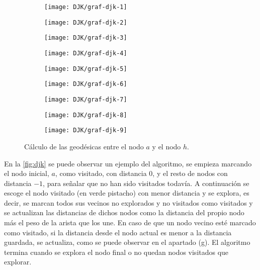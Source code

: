 \begin{figure}[htb]
	\centering
	\begin{subfigure}{0.32\linewidth}
		\texttt{[image: DJK/graf-djk-1]}
		\caption{}
	\end{subfigure}
	\begin{subfigure}{0.32\linewidth}
		\texttt{[image: DJK/graf-djk-2]}
		\caption{}
	\end{subfigure}
	\begin{subfigure}{0.32\linewidth}
		\texttt{[image: DJK/graf-djk-3]}
		\caption{}
	\end{subfigure}
	\begin{subfigure}{0.32\linewidth}
		\texttt{[image: DJK/graf-djk-4]}
		\caption{}
	\end{subfigure}
	\begin{subfigure}{0.32\linewidth}
		\texttt{[image: DJK/graf-djk-5]}
		\caption{}
	\end{subfigure}
	\begin{subfigure}{0.32\linewidth}
		\texttt{[image: DJK/graf-djk-6]}
		\caption{}
	\end{subfigure}
	\begin{subfigure}{0.32\linewidth}
		\texttt{[image: DJK/graf-djk-7]}
		\caption{}
	\end{subfigure}
	\begin{subfigure}{0.32\linewidth}
		\texttt{[image: DJK/graf-djk-8]}
		\caption{}
	\end{subfigure}
	\begin{subfigure}{0.32\linewidth}
		\texttt{[image: DJK/graf-djk-9]}
		\caption{}
	\end{subfigure}
	\caption{Cálculo de las geodésicas entre el nodo $a$ y el nodo $h$.}
	\label{fig:djk}
\end{figure}

En la \autoref{fig:djk} se puede observar un ejemplo del algoritmo, se empieza marcando el nodo inicial, $a$, como visitado, con distancia $0$, y el resto de nodos con distancia $-1$, para señalar que no han sido visitados todavía. A continuación se escoge el nodo visitado (en verde pistacho) con menor distancia y se explora, es decir, se marcan todos sus vecinos no explorados y no visitados como visitados y se actualizan las distancias de dichos nodos como la distancia del propio nodo más el peso de la arista que los une. En caso de que un nodo vecino esté marcado como visitado, si la distancia desde el nodo actual es menor a la distancia guardada, se actualiza, como se puede observar en el apartado (g). El algoritmo termina cuando se explora el nodo final o no quedan nodos visitados que explorar. \\


